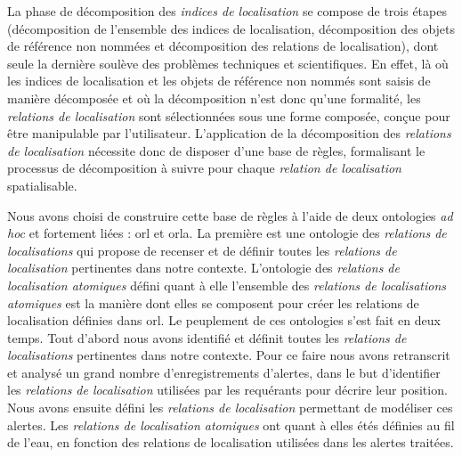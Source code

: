 La phase de décomposition des \emph{indices de localisation} se
compose de trois étapes (décomposition de l'ensemble des indices de
localisation, décomposition des objets de référence non nommées et
décomposition des relations de localisation), dont seule la dernière
soulève des problèmes techniques et scientifiques. En effet, là où les
indices de localisation et les objets de référence non nommés sont
saisis de manière décomposée et où la décomposition n'est donc qu'une
formalité, les \emph{relations de localisation} sont sélectionnées
sous une forme composée, conçue pour être manipulable par
l'utilisateur. L’application de la décomposition des \emph{relations
  de localisation} nécessite donc de disposer d'une base de règles,
formalisant le processus de décomposition à suivre pour chaque
\emph{relation de localisation} spatialisable.

Nous avons choisi de construire cette base de règles à l'aide de deux
ontologies \emph{ad hoc} et fortement liées : \ac{orl} et
\ac{orla}. La première est une ontologie des \emph{relations de
  localisations} qui propose de recenser et de définir toutes les
\emph{relations de localisation} pertinentes dans notre
contexte. L'ontologie des \emph{relations de localisation atomiques}
défini quant à elle l'ensemble des \emph{relations de localisations
  atomiques} est la manière dont elles se composent pour créer les
relations de localisation définies dans \ac{orl}. Le peuplement de ces
ontologies s'est fait en deux temps. Tout d'abord nous avons identifié
et définit toutes les \emph{relations de localisations} pertinentes
dans notre contexte. Pour ce faire nous avons retranscrit et analysé
un grand nombre d'enregistrements d'alertes, dans le but d'identifier
les \emph{relations de localisation} utilisées par les requérants pour
décrire leur position. Nous avons ensuite défini les \emph{relations
  de localisation} permettant de modéliser ces alertes. Les
\emph{relations de localisation atomiques} ont quant à elles étés
définies au fil de l'eau, en fonction des relations de localisation
utilisées dans les alertes traitées.

